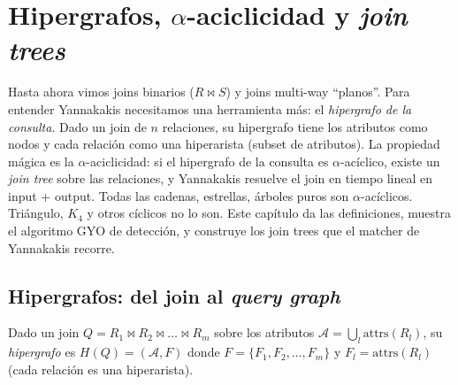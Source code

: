 \chapter{Hipergrafos, \(\alpha\)-aciclicidad y \emph{join trees}}
\label{cap:hipergrafos}

\begin{intuicion}
Hasta ahora vimos joins binarios (\(R \bowtie S\)) y joins
multi-way ``planos''. Para entender Yannakakis necesitamos una
herramienta más: el \emph{hipergrafo de la consulta}. Dado un join
de \(n\) relaciones, su hipergrafo tiene los atributos como nodos y
cada relación como una hiperarista (subset de atributos). La
propiedad mágica es la \(\alpha\)-aciclicidad: si el hipergrafo de
la consulta es \(\alpha\)-acíclico, existe un \emph{join tree} sobre
las relaciones, y Yannakakis resuelve el join en tiempo lineal en
input + output. Todas las cadenas, estrellas, árboles puros son
\(\alpha\)-acíclicos. Triángulo, \(K_4\) y otros cíclicos no lo son.
Este capítulo da las definiciones, muestra el algoritmo GYO de
detección, y construye los join trees que el matcher de Yannakakis
recorre.
\end{intuicion}

\section{Hipergrafos: del join al \emph{query graph}}

\begin{definition}
Dado un join \(Q = R_1 \bowtie R_2 \bowtie \dots \bowtie R_m\)
sobre los atributos \(\mathcal{A} = \bigcup_l \mathrm{attrs}(R_l)\),
su \emph{hipergrafo} es \(H(Q) = (\mathcal{A}, F)\) donde \(F =
\{F_1, F_2, \dots, F_m\}\) y \(F_l = \mathrm{attrs}(R_l)\) (cada
relación es una hiperarista).
\end{definition}

